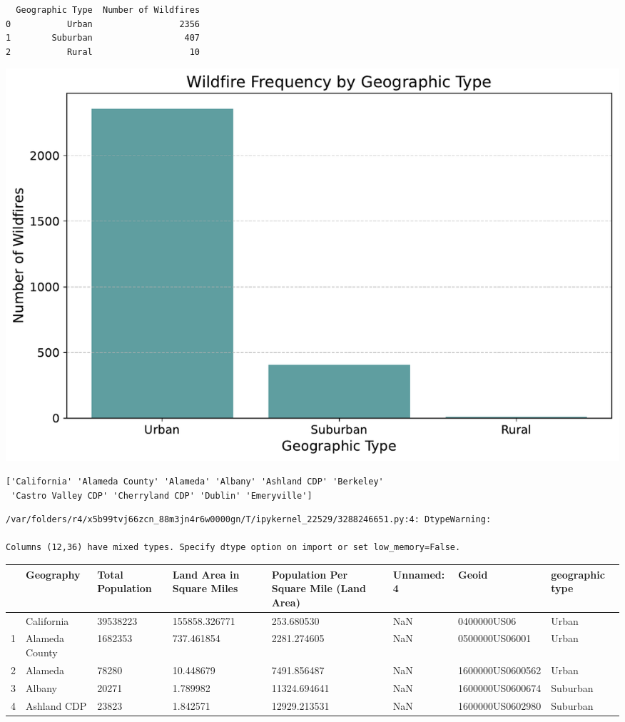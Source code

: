 \documentclass[
  letterpaper,
  DIV=11,
  numbers=noendperiod]{scrartcl}
\begin{document}
\begin{verbatim}
  Geographic Type  Number of Wildfires
0           Urban                 2356
1        Suburban                  407
2           Rural                   10
\end{verbatim}

\includegraphics{Final Writeup_files/figure-pdf/cell-7-output-2.pdf}

\begin{verbatim}
['California' 'Alameda County' 'Alameda' 'Albany' 'Ashland CDP' 'Berkeley'
 'Castro Valley CDP' 'Cherryland CDP' 'Dublin' 'Emeryville']
\end{verbatim}

\begin{verbatim}
/var/folders/r4/x5b99tvj66zcn_88m3jn4r6w0000gn/T/ipykernel_22529/3288246651.py:4: DtypeWarning:

Columns (12,36) have mixed types. Specify dtype option on import or set low_memory=False.
\end{verbatim}

\begin{longtable}[]{@{}llllllll@{}}
\toprule\noalign{}
& Geography & Total Population & Land Area in Square Miles & Population
Per Square Mile (Land Area) & Unnamed: 4 & Geoid & geographic type \\
\midrule\noalign{}
\endhead
\bottomrule\noalign{}
\endlastfoot
0 & California & 39538223 & 155858.326771 & 253.680530 & NaN &
0400000US06 & Urban \\
1 & Alameda County & 1682353 & 737.461854 & 2281.274605 & NaN &
0500000US06001 & Urban \\
2 & Alameda & 78280 & 10.448679 & 7491.856487 & NaN & 1600000US0600562 &
Urban \\
3 & Albany & 20271 & 1.789982 & 11324.694641 & NaN & 1600000US0600674 &
Suburban \\
4 & Ashland CDP & 23823 & 1.842571 & 12929.213531 & NaN &
1600000US0602980 & Suburban \\
\end{longtable}
\end{document}
